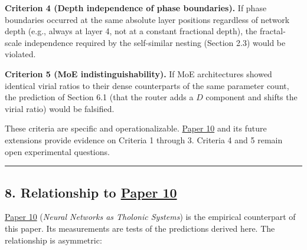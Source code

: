 \documentclass[
  11pt,
  letterpaper,
]{article}
\begin{document}
\textbf{Criterion 4 (Depth independence of phase boundaries).} If phase
boundaries occurred at the same absolute layer positions regardless of
network depth (e.g., always at layer 4, not at a constant fractional
depth), the fractal-scale independence required by the self-similar
nesting (Section 2.3) would be violated.

\textbf{Criterion 5 (MoE indistinguishability).} If MoE architectures
showed identical virial ratios to their dense counterparts of the same
parameter count, the prediction of Section 6.1 (that the router adds a
\(D\) component and shifts the virial ratio) would be falsified.

These criteria are specific and operationalizable.
\href{https://github.com/baardev/truevalue/blob/main/docnav/Research/papers/10_tholonic-neural-architecture/10_tholonic-neural-architecture.pdf}{Paper
10} and its future extensions provide evidence on Criteria 1 through 3.
Criteria 4 and 5 remain open experimental questions.

\begin{center}\rule{0.5\linewidth}{0.5pt}\end{center}

\subsection{\texorpdfstring{8. Relationship to
\href{https://github.com/baardev/truevalue/blob/main/docnav/Research/papers/10_tholonic-neural-architecture/10_tholonic-neural-architecture.pdf}{Paper
10}}{8. Relationship to Paper 10}}\label{relationship-to-paper-10}

\href{https://github.com/baardev/truevalue/blob/main/docnav/Research/papers/10_tholonic-neural-architecture/10_tholonic-neural-architecture.pdf}{Paper
10} (\emph{Neural Networks as Tholonic Systems}) is the empirical
counterpart of this paper. Its measurements are tests of the predictions
derived here. The relationship is asymmetric:
\end{document}
